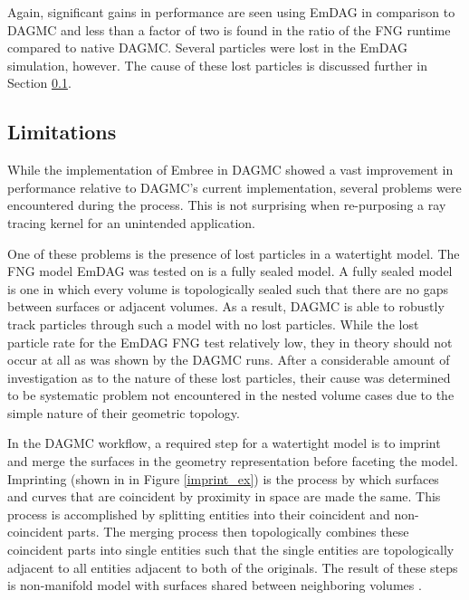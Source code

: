 Again, significant gains in performance are seen using EmDAG in comparison to
DAGMC and less than a factor of two is found in the ratio of the FNG runtime
compared to native DAGMC. Several particles were lost in the EmDAG simulation,
however. The cause of these lost particles is discussed further in Section
\ref{sec:emdag_limitations}.

\subsection{Limitations}\label{sec:emdag_limitations}

While the implementation of Embree in DAGMC showed a vast improvement in
performance relative to DAGMC's current implementation, several problems were
encountered during the process. This is not surprising when re-purposing a ray
tracing kernel for an unintended application.

One of these problems is the presence of lost particles in a watertight
model. The FNG model EmDAG was tested on is a fully sealed model. A fully sealed
model is one in which every volume is topologically sealed such that there are
no gaps between surfaces or adjacent volumes. As a result, DAGMC is able to
robustly track particles through such a model with no lost particles. While the
lost particle rate for the EmDAG FNG test relatively low, they in theory should
not occur at all as was shown by the DAGMC runs. After a considerable amount of
investigation as to the nature of these lost particles, their cause was
determined to be systematic problem not encountered in the nested volume cases
due to the simple nature of their geometric topology.

In the DAGMC workflow, a required step for a watertight model is to imprint and
merge the surfaces in the geometry representation before faceting the
model. Imprinting (shown in in Figure \ref{imprint_ex}) is the process by which
surfaces and curves that are coincident by proximity in space are made the
same. This process is accomplished by splitting entities into their coincident
and non-coincident parts. The merging process then topologically combines these
coincident parts into single entities such that the single entities are
topologically adjacent to all entities adjacent to both of the originals. The
result of these steps is non-manifold model with surfaces shared between
neighboring volumes \cite{Smith_2011}.

